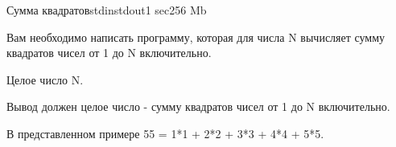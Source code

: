 \begin{problem}{Сумма квадратов}{stdin}{stdout}{1 sec}{256 Mb}

Вам необходимо написать программу, которая для числа N вычисляет сумму квадратов чисел от 1 до N включительно.

\InputFile

Целое число N.

\OutputFile

Вывод должен целое число - сумму квадратов чисел от 1 до N включительно.
\Example

\begin{example}
%
\end{example}

\Note

В представленном примере 55 = 1*1 + 2*2 + 3*3 + 4*4 + 5*5.

\end{problem}